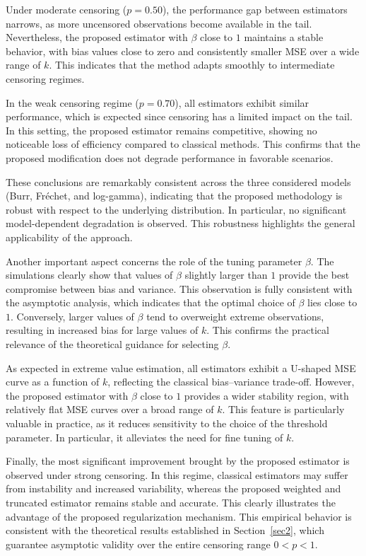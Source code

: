 \documentclass[reqno,openbib,runningheads,a4paper,12pt]{amsart}%
\begin{document}
\noindent Under moderate censoring ($p=0.50$), the performance gap between
estimators narrows, as more uncensored observations become available in the
tail. Nevertheless, the proposed estimator with $\beta$ close to $1$ maintains
a stable behavior, with bias values close to zero and consistently smaller MSE
over a wide range of $k$. This indicates that the method adapts smoothly to
intermediate censoring regimes.\smallskip

\noindent In the weak censoring regime ($p=0.70$), all estimators exhibit
similar performance, which is expected since censoring has a limited impact on
the tail. In this setting, the proposed estimator remains competitive, showing
no noticeable loss of efficiency compared to classical methods. This confirms
that the proposed modification does not degrade performance in favorable
scenarios.\smallskip

\noindent These conclusions are remarkably consistent across the three
considered models (Burr, Fr\'{e}chet, and log-gamma), indicating that the
proposed methodology is robust with respect to the underlying distribution. In
particular, no significant model-dependent degradation is observed. This
robustness highlights the general applicability of the approach.\smallskip

\noindent Another important aspect concerns the role of the tuning parameter
$\beta$. The simulations clearly show that values of $\beta$ slightly larger
than $1$ provide the best compromise between bias and variance. This
observation is fully consistent with the asymptotic analysis, which indicates
that the optimal choice of $\beta$ lies close to $1$. Conversely, larger
values of $\beta$ tend to overweight extreme observations, resulting in
increased bias for large values of $k$. This confirms the practical relevance
of the theoretical guidance for selecting $\beta$.\smallskip

\noindent As expected in extreme value estimation, all estimators exhibit a
U-shaped MSE curve as a function of $k$, reflecting the classical
bias--variance trade-off. However, the proposed estimator with $\beta$ close
to $1$ provides a wider stability region, with relatively flat MSE curves over
a broad range of $k$. This feature is particularly valuable in practice, as it
reduces sensitivity to the choice of the threshold parameter. In particular,
it alleviates the need for fine tuning of $k$.\smallskip

\noindent Finally, the most significant improvement brought by the proposed
estimator is observed under strong censoring. In this regime, classical
estimators may suffer from instability and increased variability, whereas the
proposed weighted and truncated estimator remains stable and accurate. This
clearly illustrates the advantage of the proposed regularization mechanism.
This empirical behavior is consistent with the theoretical results established
in Section~\ref{sec2}, which guarantee asymptotic validity over the entire
censoring range $0<p<1$.\smallskip
\end{document}
